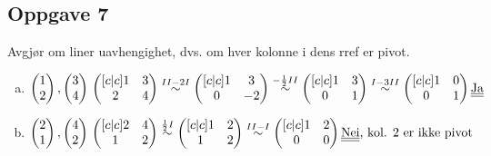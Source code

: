 \documentclass{article}
\newcommand{\vect}[1]{\begin{pmatrix} #1 \end{pmatrix}}
\newcommand{\uu}[1]{\underline{\underline{#1}}}
\newcommand{\eqqto}[1]{\overset{\substack{#1}}{\sim}}
\begin{document}
\subsection*{Oppgave 7}
Avgjør om liner uavhengighet, dvs. om hver kolonne i dens rref er pivot.
\begin{enumerate}[a)]

\item \(
\vect{1\\2}, \vect{3\\4}
\\\\\\
\begin{pmatrix}[c|c]
1&3\\
2&4
\end{pmatrix}
\eqqto{II-2I}
\begin{pmatrix}[c|c]
1&3\\
0&-2
\end{pmatrix}
\eqqto{-\frac{1}{2}II}
\begin{pmatrix}[c|c]
1&3\\
0&1
\end{pmatrix}
\eqqto{I-3II}
\begin{pmatrix}[c|c]
1&0\\
0&1
\end{pmatrix}
\\\\\\
\text{\uu{Ja}}
\)

\vspace{2em}

\item \(
\vect{2\\1}, \vect{4\\2}
\\\\\\
\begin{pmatrix}[c|c]
2&4\\
1&2
\end{pmatrix}
\eqqto{\frac{1}{2}I}
\begin{pmatrix}[c|c]
1&2\\
1&2
\end{pmatrix}
\eqqto{II-I}
\begin{pmatrix}[c|c]
1&2\\
0&0
\end{pmatrix}
\\\\\\
\text{\uu{Nei}, kol. 2 er ikke pivot}
\)


\end{enumerate}
\end{document}

